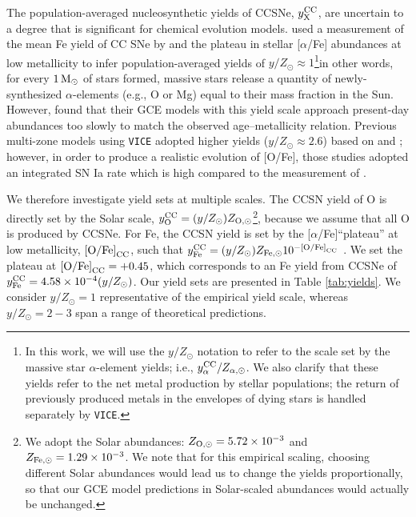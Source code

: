 \documentclass[twocolumn,twocolappendix,linenumbers]{aastex631}
\newcommand{\aFe}{[$\alpha$/Fe]\xspace}
\newcommand{\mathOFe}{{\rm [O/Fe]}}
\newcommand{\yZ}[1]{$y/Z_\odot=#1$}
\newcommand{\Msun}{\,{\rm M}_\odot}
\begin{document}
The population-averaged nucleosynthetic yields of CCSNe, $y_{\rm X}^{\rm CC}$, are uncertain to a degree that is significant for chemical evolution models. 
\citet{weinberg_scale_2024} used a measurement of the mean Fe yield of CC SNe by \citet{rodriguez_iron_2023} and the plateau in stellar \aFe abundances at low metallicity to infer population-averaged yields of $y/Z_\odot\approx1$\footnote{
    In this work, we will use the $y/Z_\odot$ notation to refer to the scale set by the massive star $\alpha$-element yields; i.e., $y_{\alpha}^{\rm CC}/Z_{\alpha,\odot}$. We also clarify that these yields refer to the net metal production by stellar populations; the return of previously produced metals in the envelopes of dying stars is handled separately by {\tt VICE}.
}\textemdash in other words, for every $1\Msun$ of stars formed, massive stars release a quantity of newly-synthesized $\alpha$-elements (e.g., O or Mg) equal to their mass fraction in the Sun. However, \citet{johnson_milky_2024} found that their GCE models with this yield scale approach present-day abundances too slowly to match the observed age--metallicity relation. Previous multi-zone models using {\tt VICE} \citep[e.g.,][]{johnson_stellar_2021,dubay_galactic_2024} adopted higher yields ($y/Z_\odot\approx2.6$) based on \citet{chieffi_explosive_2004} and \citet{limongi_nucleosynthesis_2006}; however, in order to produce a realistic evolution of [O/Fe], those studies adopted an integrated SN Ia rate which is high compared to the measurement of \citet{maoz_star_2017}.

We therefore investigate yield sets at multiple scales. The CCSN yield of O is directly set by the Solar scale, $y_{\rm O}^{\rm CC}=(y/Z_\odot)Z_{\rm O,\odot}$\footnote{
    We adopt the \citet{asplund_chemical_2009} Solar abundances: $Z_{\rm O,\odot}=5.72\times10^{-3}$ and $Z_{\rm Fe,\odot}=1.29\times10^{-3}$. We note that for this empirical scaling, choosing different Solar abundances \citep[e.g.,][]{magg_observational_2022} would lead us to change the yields proportionally, so that our GCE model predictions in Solar-scaled abundances would actually be unchanged.
}, because we assume that all O is produced by CCSNe. For Fe, the CCSN yield is set by the \aFe ``plateau'' at low metallicity, $\mathOFe_{\rm CC}$, such that $y_{\rm Fe}^{\rm CC}=(y/Z_\odot) Z_{\rm Fe,\odot} 10^{-\mathOFe_{\rm CC}}$ \citep[for further discussion on the empirical yield scale and the CCSN plateau, see][]{weinberg_scale_2024}. We set the plateau at $\mathOFe_{\rm CC}=+0.45$, which corresponds to an Fe yield from CCSNe of $y_{\rm Fe}^{\rm CC}=4.58\times10^{-4}(y/Z_\odot)$. Our yield sets are presented in Table \ref{tab:yields}. We consider \yZ{1} representative of the empirical yield scale, whereas \yZ{2-3} span a range of theoretical predictions.
\end{document}
